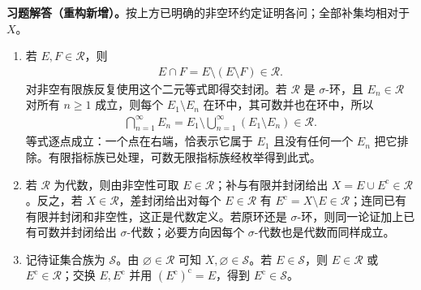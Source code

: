 \documentclass[../../main.tex]{subfiles}%
\begin{document}
\begin{solution}
\label{solution:ch01-rings}
\textbf{习题解答（重构新增）。}按上方已明确的非空环约定证明各问；全部补集均相对于 $X$。
\begin{enumerate}[label=\alph*.,ref=(\alph*)]
\item\label{item:ch01-rings-solution-intersections} 若 $E,F\in\mathscr{R}$，则
\begin{align*}
E\cap F=E\setminus(E\setminus F)\in\mathscr{R}.
\end{align*}
对非空有限族反复使用这个二元等式即得交封闭。若 $\mathscr{R}$ 是 $\sigma$-环，且 $E_n\in\mathscr{R}$ 对所有 $n\geqslant1$ 成立，则每个 $E_1\setminus E_n$ 在环中，其可数并也在环中，所以
\begin{align*}
\bigcap_{n=1}^{\infty}E_n
=E_1\setminus\bigcup_{n=1}^{\infty}(E_1\setminus E_n)
\in\mathscr{R}.
\end{align*}
等式逐点成立：一个点在右端，恰表示它属于 $E_1$ 且没有任何一个 $E_n$ 把它排除。有限指标族已处理，可数无限指标族经枚举得到此式。
\item\label{item:ch01-rings-solution-algebras} 若 $\mathscr{R}$ 为代数，则由非空性可取 $E\in\mathscr{R}$；补与有限并封闭给出 $X=E\cup E^{\mathrm c}\in\mathscr{R}$。反之，若 $X\in\mathscr{R}$，差封闭给出对每个 $E\in\mathscr{R}$ 有 $E^{\mathrm c}=X\setminus E\in\mathscr{R}$；连同已有有限并封闭和非空性，这正是代数定义。若原环还是 $\sigma$-环，则同一论证加上已有可数并封闭给出 $\sigma$-代数；必要方向因每个 $\sigma$-代数也是代数而同样成立。
\item\label{item:ch01-rings-solution-complements} 记待证集合族为 $\mathscr{S}$。由 $\varnothing\in\mathscr{R}$ 可知 $X,\varnothing\in\mathscr{S}$。若 $E\in\mathscr{S}$，则 $E\in\mathscr{R}$ 或 $E^{\mathrm c}\in\mathscr{R}$；交换 $E,E^{\mathrm c}$ 并用 $(E^{\mathrm c})^{\mathrm c}=E$，得到 $E^{\mathrm c}\in\mathscr{S}$。


\end{enumerate}
\end{solution}
\end{document}
